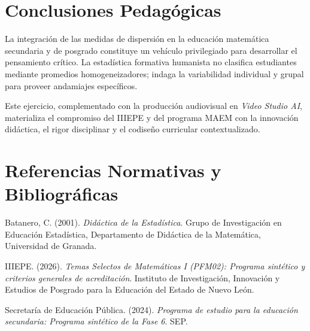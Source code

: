 \documentclass[spanish,letterpaper,oneside]{article}
\begin{document}
\section{Conclusiones Pedagógicas}
La integración de las medidas de dispersión en la educación matemática secundaria y de posgrado constituye un vehículo privilegiado para desarrollar el pensamiento crítico. La estadística formativa humanista no clasifica estudiantes mediante promedios homogeneizadores; indaga la variabilidad individual y grupal para proveer andamiajes específicos.

Este ejercicio, complementado con la producción audiovisual en \textit{Video Studio AI}, materializa el compromiso del IIIEPE y del programa MAEM con la innovación didáctica, el rigor disciplinar y el codiseño curricular contextualizado.

\section*{Referencias Normativas y Bibliográficas}
{\setlength{\parskip}{6pt}
\par\hangindent=1.27cm  Batanero, C. (2001). \textit{Didáctica de la Estadística}. Grupo de Investigación en Educación Estadística, Departamento de Didáctica de la Matemática, Universidad de Granada.
\par\hangindent=1.27cm  IIIEPE. (2026). \textit{Temas Selectos de Matemáticas I (PFM02): Programa sintético y criterios generales de acreditación}. Instituto de Investigación, Innovación y Estudios de Posgrado para la Educación del Estado de Nuevo León.
\par\hangindent=1.27cm  Secretaría de Educación Pública. (2024). \textit{Programa de estudio para la educación secundaria: Programa sintético de la Fase 6}. SEP.
}
\end{document}
